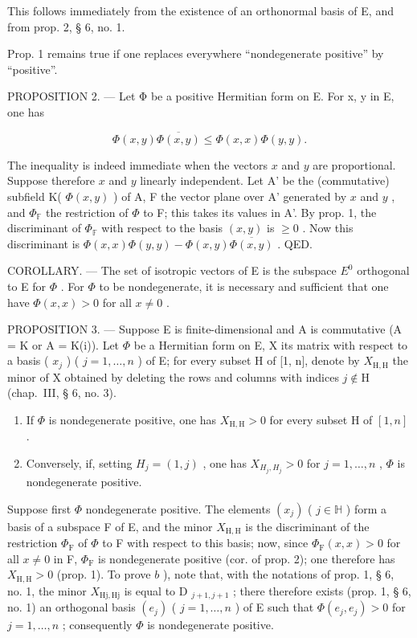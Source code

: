 This follows immediately from the existence of an orthonormal basis of E, and from prop. 2, § 6, no. 1.

Prop. 1 remains true if one replaces everywhere “nondegenerate positive” by “positive”.

PROPOSITION 2. --- Let Φ be a positive Hermitian form on E. For x, y in E, one has

\[
\Phi (x, y) \overline {{{{\Phi (x , y)}}}} \leqslant \Phi (x, x) \Phi (y, y).\tag{1}
\]

The inequality is indeed immediate when the vectors \(x\) and \(y\) are proportional. Suppose therefore \(x\) and \(y\) linearly independent. Let A' be the (commutative) subfield K( \(\Phi(x, y)\) ) of A, F the vector plane over A' generated by \(x\) and \(y\) , and \(\Phi_{\mathbb{F}}\) the restriction of \(\Phi\) to F; this takes its values in A'. By prop. 1, the discriminant of \(\Phi_{\mathbb{F}}\) with respect to the basis \((x, y)\) is \(\geqslant 0\) . Now this discriminant is \(\Phi(x, x)\Phi(y, y) - \Phi(x, y)\overline{\Phi(x, y)}\) . QED.

COROLLARY. --- The set of isotropic vectors of E is the subspace \(E^{0}\) orthogonal to E for \(\Phi\) . For \(\Phi\) to be nondegenerate, it is necessary and sufficient that one have \(\Phi(x, x) > 0\) for all \(x \neq 0\) .

PROPOSITION 3. --- Suppose E is finite-dimensional and A is commutative (A = K or A = K(i)). Let \(\Phi\) be a Hermitian form on E, X its matrix with respect to a basis ( \(x_j\) ) ( \(j = 1, \ldots, n\) ) of E; for every subset H of {[}1, n{]}, denote by \(X_{\mathrm{H,H}}\) the minor of X obtained by deleting the rows and columns with indices \(j \notin \mathrm{H}\) (chap.~III, § 6, no. 3).

\begin{enumerate}
\def\labelenumi{\alph{enumi})}
\item
  If \(\Phi\) is nondegenerate positive, one has \(X_{\mathrm{H,H}} > 0\) for every subset H of \([1, n]\) .
\item
  Conversely, if, setting \(H_{j} = (1, j)\) , one has \(X_{H_{j}, H_{j}} > 0\) for \(j = 1, \ldots, n\) , \(\Phi\) is nondegenerate positive.
\end{enumerate}

Suppose first \(\Phi\) nondegenerate positive. The elements \((x_{j})\) ( \(j\in\mathbb{H}\) ) form a basis of a subspace F of E, and the minor \(X_{\mathrm{H,H}}\) is the discriminant of the restriction \(\Phi_{\mathrm{F}}\) of \(\Phi\) to F with respect to this basis; now, since \(\Phi_{\mathrm{F}}(x,x)>0\) for all \(x\neq0\) in F, \(\Phi_{\mathrm{F}}\) is nondegenerate positive (cor. of prop. 2); one therefore has \(X_{\mathrm{H,H}}>0\) (prop. 1). To prove \(b\) ), note that, with the notations of prop. 1, § 6, no. 1, the minor \(X_{\mathrm{Hj,Hj}}\) is equal to D \(_{j+1,j+1}\) ; there therefore exists (prop. 1, § 6, no. 1) an orthogonal basis \((e_{j})\) ( \(j=1,\ldots,n\) ) of E such that \(\Phi(e_{j},e_{j})>0\) for \(j=1,\ldots,n\) ; consequently \(\Phi\) is nondegenerate positive.

